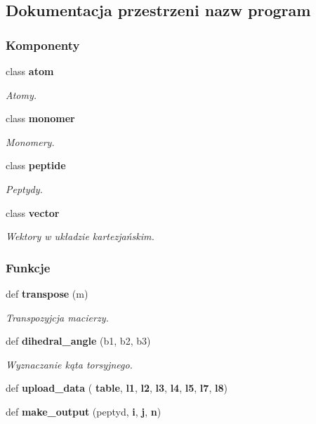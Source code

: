 \subsection{Dokumentacja przestrzeni nazw program}
\label{namespaceprogram}
\subsubsection*{Komponenty}
\begin{DoxyCompactItemize}
\item 
class \textbf{ atom}
\begin{DoxyCompactList}\small\item\em Atomy. \end{DoxyCompactList}\item 
class \textbf{ monomer}
\begin{DoxyCompactList}\small\item\em Monomery. \end{DoxyCompactList}\item 
class \textbf{ peptide}
\begin{DoxyCompactList}\small\item\em Peptydy. \end{DoxyCompactList}\item 
class \textbf{ vector}
\begin{DoxyCompactList}\small\item\em Wektory w układzie kartezjańskim. \end{DoxyCompactList}\end{DoxyCompactItemize}
\subsubsection*{Funkcje}
\begin{DoxyCompactItemize}
\item 
def \textbf{ transpose} (m)
\begin{DoxyCompactList}\small\item\em Transpozyjcja macierzy. \end{DoxyCompactList}\item 
def \textbf{ dihedral\+\_\+angle} (b1, b2, b3)
\begin{DoxyCompactList}\small\item\em Wyznaczanie kąta torsyjnego. \end{DoxyCompactList}\item 
def \textbf{ upload\+\_\+data} (\textbf{ table}, \textbf{ l1}, \textbf{ l2}, \textbf{ l3}, \textbf{ l4}, \textbf{ l5}, \textbf{ l7}, \textbf{ l8})
\item 
def \textbf{ make\+\_\+output} (peptyd, \textbf{ i}, \textbf{ j}, \textbf{ n})
\end{DoxyCompactItemize}
